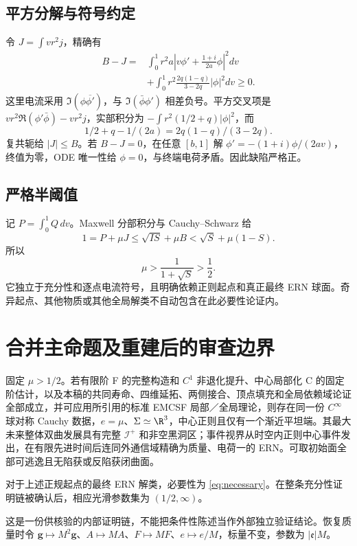 \subsection{平方分解与符号约定}
令 $J=\int vr^2j$，精确有
\begin{equation}\label{eq:square}
\boxed{\begin{aligned}
B-J={}&\int_0^1r^2a\left|v\phi'+\frac{1+i}{2a}\phi\right|^2dv\\
&+\int_0^1r^2\frac{2q(1-q)}{3-2q}|\phi|^2dv\ge0.
\end{aligned}}
\end{equation}
这里电流采用 $\Im(\phi\overline{\phi'})$，与 $\Im(\bar\phi\phi')$ 相差负号。平方交叉项是 $vr^2\Re(\phi'\bar\phi)-vr^2j$，实部积分为 $-\int r^2(1/2+q)|\phi|^2$，而
\[
1/2+q-1/(2a)=2q(1-q)/(3-2q).
\]
复共轭给 $|J|\le B$。若 $B-J=0$，在任意 $[b,1]$ 解
$\phi'=-(1+i)\phi/(2av)$，终值为零，ODE 唯一性给 $\phi=0$，与终端电荷矛盾。因此缺陷严格正。

\subsection{严格半阈值}
记 $P=\int_0^1Q\,dv$。Maxwell 分部积分与 Cauchy--Schwarz 给
\[
1=P+\mu J\le\sqrt{IS}+\mu B
<\sqrt S+\mu(1-S).
\]
所以
\begin{equation}\label{eq:necessary}
\boxed{\mu>\frac1{1+\sqrt S}>\frac12.}
\end{equation}
它独立于充分性和逐点电流符号，且明确依赖正则起点和真正最终 ERN 球面。奇异起点、其他物质或其他全局解类不自动包含在此必要性论证内。

\section{合并主命题及重建后的审查边界}
\begin{theorem}[证明链的条件性结论]
固定 $\mu>1/2$。若有限阶 F 的完整构造和 $C^1$ 非退化提升、中心局部化 C 的固定阶估计，以及本稿的共同寿命、四维延拓、两侧接合、顶点填充和全局依赖域论证全部成立，并可应用所引用的标准 EMCSF 局部／全局理论，则存在同一份 $C^\infty$ 球对称 Cauchy 数据，$e=\mu$、$\Sigma\simeq\R^3$，中心正则且仅有一个渐近平坦端。其最大未来整体双曲发展具有完整 $\mathcal I^+$ 和非空黑洞区；事件视界从时空内正则中心事件发出，在有限先进时间后连同外通信域精确为质量、电荷一的 ERN。可取初始面全部可逃逸且无陷获或反陷获闭曲面。

对于上述正规起点的最终 ERN 解类，必要性为 \eqref{eq:necessary}。在整条充分性证明链被确认后，相应光滑参数集为 $(1/2,\infty)$。
\end{theorem}
这是一份供核验的内部证明链，不能把条件性陈述当作外部独立验证结论。恢复质量时令 $\mathbf g\mapsto M^2\mathbf g$、$A\mapsto MA$、$F\mapsto MF$、$e\mapsto e/M$，标量不变，参数为 $|\mathfrak e|M$。

